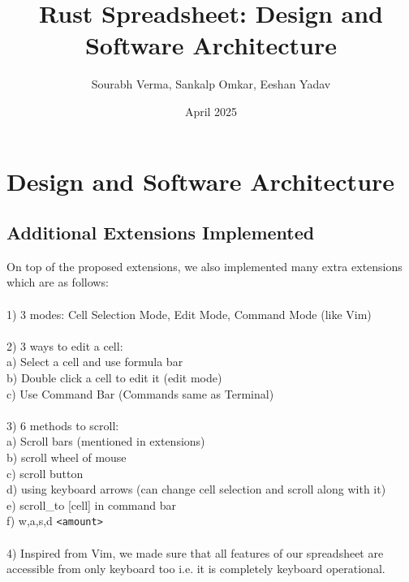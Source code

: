 \documentclass{article}
\title{Rust Spreadsheet: Design and Software Architecture}
\author{Sourabh Verma, Sankalp Omkar, Eeshan Yadav}
\date{April 2025}
\begin{document}
\maketitle

\section{Design and Software Architecture}

\subsection{Additional Extensions Implemented}
\label{sec:additional_extensions}
On top of the proposed extensions, we also implemented many extra extensions which are as follows:
\\ \\
1) 3 modes: Cell Selection Mode, Edit Mode, Command Mode (like Vim)
\\
\\
2) 3 ways to edit a cell:\\
\hspace*{5mm}a) Select a cell and use formula bar\\
\hspace*{5mm}b) Double click a cell to edit it (edit mode)\\
\hspace*{5mm}c) Use Command Bar (Commands same as Terminal)
\\
\\
3) 6 methods to scroll:\\ 
\hspace*{5mm}a) Scroll bars (mentioned in extensions)\\
\hspace*{5mm}b) scroll wheel of mouse\\
\hspace*{5mm}c) scroll button\\
\hspace*{5mm}d) using keyboard arrows (can change cell selection and scroll along with it)\\
\hspace*{5mm}e) scroll\_to [cell] in command bar\\
\hspace*{5mm}f) w,a,s,d \texttt{\textless{}amount\textgreater{}} \\
\\
4) Inspired from Vim, we made sure that all features of our spreadsheet are accessible from only keyboard too i.e. it is completely keyboard operational.
\end{document}
